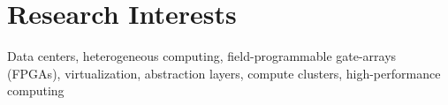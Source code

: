 \section{\sc Research Interests}


Data centers, heterogeneous computing, field-programmable gate-arrays (FPGAs), virtualization, abstraction layers, compute clusters, high-performance computing
